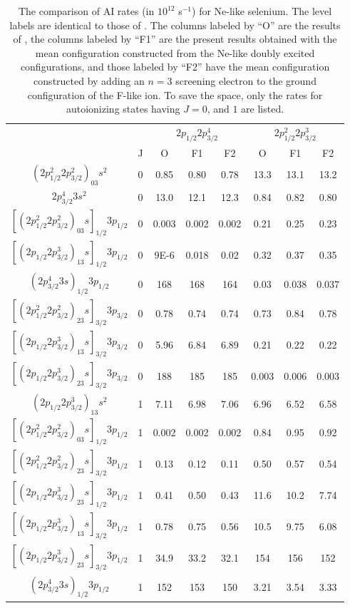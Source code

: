 \documentclass{elsart}
\begin{document}
\begin{table}
\caption{\label{tab_comparison} The comparison of AI rates (in $10^{12}$
s$^{-1}$) for Ne-like selenium. The level labels are identical to those of
\citet{oreg91}. The columns labeled by ``O'' are the results of \citet{oreg91},
the columns labeled by ``F1'' are the present results obtained with the mean
configuration constructed from the Ne-like doubly excited configurations, and
those labeled by ``F2'' have the mean configuration constructed by adding an
$n = 3$ screening electron to the ground configuration of the F-like ion. To
save the space, only the rates for autoionizing states having
$J = 0$, and $1$ are listed.}
\begin{tabular}{*{8}{c}}
\hline\hline
&&\multicolumn{3}{c}{$2p_{1/2}2p^4_{3/2}$}&
\multicolumn{3}{c}{$2p^2_{1/2}2p^3_{3/2}$} \\
&J&O&F1&F2&O&F1&F2\\
\hline
$(2p^2_{1/2}2p^2_{3/2})_03s^2$&0&0.85&0.80&0.78&13.3&13.1&13.2\\
$2p^4_{3/2}3s^2$&0&13.0&12.1&12.3&0.84&0.82&0.80\\
$[(2p^2_{1/2}2p^2_{3/2})_03s]_{1/2}3p_{1/2}$&0&0.003&0.002&0.002&0.21&0.25&0.23\\
$[(2p_{1/2}2p^3_{3/2})_13s]_{1/2}3p_{1/2}$&0&9E-6&0.018&0.02&0.32&0.37&0.35\\
$(2p^4_{3/2}3s)_{1/2}3p_{1/2}$&0&168&168&164&0.03&0.038&0.037\\
$[(2p^2_{1/2}2p^2_{3/2})_23s]_{3/2}3p_{3/2}$&0&0.78&0.74&0.74&0.73&0.84&0.78\\
$[(2p_{1/2}2p^3_{3/2})_13s]_{3/2}3p_{3/2}$&0&5.96&6.84&6.89&0.21&0.22&0.22\\
$[(2p_{1/2}2p^3_{3/2})_23s]_{3/2}3p_{3/2}$&0&188&185&185&0.003&0.006&0.003\\
$(2p_{1/2}2p^3_{3/2})_13s^2$&1&7.11&6.98&7.06&6.96&6.52&6.58\\
$[(2p^2_{1/2}2p^2_{3/2})_03s]_{1/2}3p_{1/2}$&1&0.002&0.002&0.002&0.84&0.95&0.92\\
$[(2p^2_{1/2}2p^2_{3/2})_23s]_{3/2}3p_{1/2}$&1&0.13&0.12&0.11&0.50&0.57&0.54\\
$[(2p_{1/2}2p^3_{3/2})_23s]_{1/2}3p_{1/2}$&1&0.41&0.50&0.43&11.6&10.2&7.74\\
$[(2p_{1/2}2p^3_{3/2})_13s]_{3/2}3p_{1/2}$&1&0.78&0.75&0.56&10.5&9.75&6.08\\
$[(2p_{1/2}2p^3_{3/2})_23s]_{3/2}3p_{1/2}$&1&34.9&33.2&32.1&154&156&152\\
$(2p^4_{3/2}3s)_{1/2}3p_{1/2}$&1&152&153&150&3.21&3.54&3.33\\

\end{tabular}
\end{table}
\end{document}

